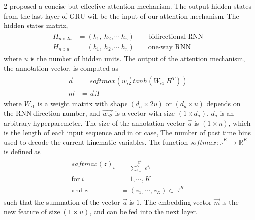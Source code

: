 \begin{multicols}{2}
\cite{lin2017structured} proposed a concise but effective attention mechanism.
The output hidden states from the last layer of GRU will be the input of our attention mechanism.
The hidden states matrix,
\begin{align}
    \begin{split}
        H_{n \times 2u} &= (h_1, \ h_2, \cdots \ h_n) \qquad \text{bidirectional RNN} \\
        H_{n \times u} &= (h_1, \ h_2, \cdots \ h_n)  \qquad \text{one-way RNN}
    \end{split}
\end{align}
\noindent where $u$ is the number of hidden units.
The output of the attention mechanism, the annotation vector, is computed as
\begin{align}
    \label{eq:annotation_vector_calculation}
    \begin{split}
        \vec{a} &= softmax( \vec{w_{s2}} \ tanh( W_{s1} \ H^{T} ) )  \\
        \vec{m} &= \vec{a} H
    \end{split}
\end{align}
\noindent where $W_{s1}$ is a weight matrix with shape $(d_a \times 2u)$ or $(d_a \times u)$ depends on the RNN direction number,
and $\vec{w_{s2}}$ is a vector with size $(1 \times d_a)$.
$d_a$ is an arbitrary hyperparemeter.
The size of the annotation vector $\vec{a}$ is $(1 \times n)$, which is the length of each input sequence and in or case,
The number of past time bins used to decode the current kinematic variables.
The function $ softmax: \mathbb{R}^K \rightarrow \mathbb{R}^K$ is defined as
\begin{align}
    \begin{split}
    softmax(z)_i &= \frac{e^{z_i}}{ \sum^{K}_{j=1} e^{z_j} } \\ 
    \text{for} \ i &=1, \cdots , K \\ 
    \text{and} \ z&= \left( z_1, \cdots,z_K \right) \in \mathbb{R}^K
    \end{split}
\end{align}
\noindent such that the summation of the vector $\vec{a}$ is $1$.
The embedding vector $\vec{m}$ is the new feature of size $(1 \times u)$, and can be fed into the next layer.



\end{multicols}
